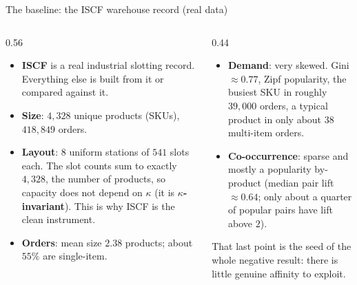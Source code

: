 \documentclass[11pt,aspectratio=169]{beamer}
\newcommand{\term}[1]{\textcolor{blue!60!black}{\textbf{#1}}}
\begin{document}
\begin{frame}{The baseline: the ISCF warehouse record (real data)}
  \begin{columns}
  \begin{column}{0.56\textwidth}
  \begin{itemize}
    \item \term{ISCF} is a real industrial slotting record. Everything else is built from it or compared against it.
    \item \textbf{Size}: $4{,}328$ unique products (SKUs), $418{,}849$ orders.
    \item \textbf{Layout}: $8$ uniform stations of $541$ slots each. The slot counts sum to exactly $4{,}328$, the number of products, so capacity does not depend on $\kappa$ (it is \term{$\kappa$-invariant}). This is why ISCF is the clean instrument.
    \item \textbf{Orders}: mean size $2.38$ products; about $55\%$ are single-item.
  \end{itemize}
  \end{column}
  \begin{column}{0.44\textwidth}
  \begin{itemize}
    \item \textbf{Demand}: very skewed. Gini $\approx 0.77$, Zipf popularity, the busiest SKU in roughly $39{,}000$ orders, a typical product in only about $38$ multi-item orders.
    \item \textbf{Co-occurrence}: sparse and mostly a popularity by-product (median pair lift $\approx 0.64$; only about a quarter of popular pairs have lift above $2$).
  \end{itemize}
  \vspace{1mm}
  \footnotesize That last point is the seed of the whole negative result: there is little genuine affinity to exploit.
  \end{column}
  \end{columns}
\end{frame}
\end{document}
